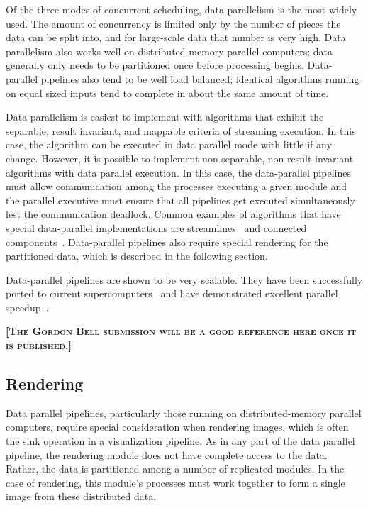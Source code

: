\documentclass[journal,onecolumn,12pt,letterpaper,twoside]{IEEEtran}
\newcommand*{\lcite}[1]{~\cite{#1}}
\newcommand{\fix}[1]{{\color{red}\textbf{\textsc{[#1]}}}}
\begin{document}
Of the three modes of concurrent scheduling, data parallelism is the most
widely used.  The amount of concurrency is limited only by the number of
pieces the data can be split into, and for large-scale data that number is
very high.  Data parallelism also works well on distributed-memory parallel
computers; data generally only needs to be partitioned once before
processing begins.  Data-parallel pipelines also tend to be well load
balanced; identical algorithms running on equal sized inputs tend to
complete in about the same amount of time.

Data parallelism is easiest to implement with algorithms that exhibit the
separable, result invariant, and mappable criteria of streaming execution.
In this case, the algorithm can be executed in data parallel mode with
little if any change.  However, it is possible to implement non-separable,
non-result-invariant algorithms with data parallel execution.  In this
case, the data-parallel pipelines must allow communication among the
processes executing a given module and the parallel executive must
ensure that all pipelines get executed simultaneously lest the
communication deadlock.  Common examples of algorithms that have special
data-parallel implementations are streamlines\lcite{Pugmire2009} and
connected components\lcite{Moreland2008:UltraVis}.  Data-parallel pipelines
also require special rendering for the partitioned data, which is described
in the following section.

Data-parallel pipelines are shown to be very scalable.  They have been
successfully ported to current
supercomputers\lcite{Moreland2008:CUG,Pugmire2008,Patchett2009} and have
demonstrated excellent parallel speedup\lcite{Childs2010}.

\fix{The Gordon Bell submission will be a good reference here once it is
  published.}

\subsection{Rendering}
\label{sec:ParallelExecution:Rendering}

Data parallel pipelines, particularly those running on distributed-memory
parallel computers, require special consideration when rendering images,
which is often the sink operation in a visualization pipeline.  As in any
part of the data parallel pipeline, the rendering module does not have
complete access to the data.  Rather, the data is partitioned among a
number of replicated modules.  In the case of rendering, this
module's processes must work together to form a single image from these
distributed data.
\end{document}
